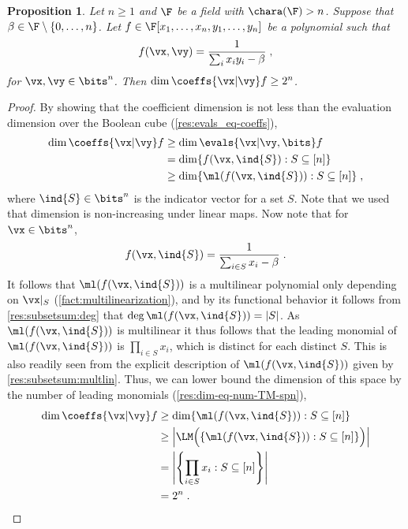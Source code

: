 \documentclass[11pt]{article}
\numberwithin{equation}{section}
\newtheorem{proposition}[theorem]{Proposition}
\theoremstyle{definition}
\theoremstyle{plain}
\begin{document}
\begin{proposition}\label{res:lbs-fn:dim-eval}
        Let $n\ge 1$ and $\F$ be a field with $\chara(\F)>n$.  Suppose that $\beta\in\F\setminus\{0,\ldots,n\}$.  Let $f\in\F[x_1,\ldots,x_n,y_1,\ldots,y_n]$ be a polynomial such that
        \[
                f(\vx,\vy)=\frac{1}{\sum_i x_iy_i-\beta}
                \;,
        \]
        for $\vx,\vy\in\bits^n$. Then $\dim\coeffs{\vx|\vy} f\ge 2^n$.
\end{proposition}
\begin{proof}
%
%
  By showing that the coefficient dimension is not less than %
  the evaluation dimension
  over the Boolean cube (\autoref{res:evals_eq-coeffs}),
        \begin{align*}
                \dim\coeffs{\vx|\vy} f
                &\ge \dim\evals{\vx|\vy,\bits} f\\
                &=\dim \{f(\vx,\ind{S}) : S\subseteq[n]\}\\
                &\ge\dim \{\ml(f(\vx,\ind{S})) : S\subseteq[n]\}
                \;,
        \end{align*}
where $\ind{S}\in\bits^n$ is the indicator vector for a set $S$. %
%
%
%
%
%
        Note that we used that dimension is non-increasing under linear maps. Now note that for $\vx\in\bits^n$,     %
    \[
                f(\vx,\ind{S})=\frac{1}{\sum_{i\in S} x_i-\beta}
                \;.   %
        \]
        It follows %
that  %
$\ml(f(\vx,\ind{S}))$ is a multilinear polynomial only depending on $\vx|_S$ (\autoref{fact:multilinearization}), and by its functional behavior it follows from \autoref{res:subsetsum:deg} that $\deg \ml(f(\vx,\ind{S}))=|S|$.  As $\ml(f(\vx,\ind{S}))$ is multilinear it thus follows that the leading monomial of $\ml(f(\vx,\ind{S}))$ is $\prod_{i\in S} x_i$, which is distinct for each distinct $S$.  This is also readily seen from the explicit description of $\ml(f(\vx,\ind{S}))$ given by \autoref{res:subsetsum:multlin}.  Thus, we can lower bound the dimension of this space by the number of leading monomials (\autoref{res:dim-eq-num-TM-spn}),
        \begin{align*}
                \dim\coeffs{\vx|\vy} f
                &\ge\dim \{\ml(f(\vx,\ind{S})) : S\subseteq[n]\}\\
                &\ge\left|\LM \Big(\{\ml(f(\vx,\ind{S})) : S\subseteq[n]\}\Big)\right|\\
                &=\left|\left\{\prod_{i\in S} x_i : S\subseteq[n]\right\}\right|\\
                &=2^n
                \;.
                \qedhere
        \end{align*}
\end{proof}
\end{document}
